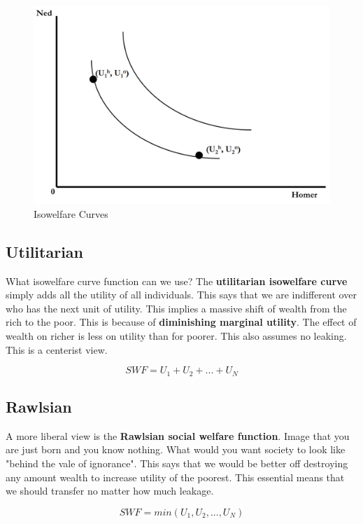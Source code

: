 \documentclass{article}
\begin{document}
\begin{figure}[H]
    \centering
    \includegraphics[scale=0.60]{"Isowelfare Curves"}
    \caption{Isowelfare Curves}
\end{figure}

\subsection{ Utilitarian }

What isowelfare curve function can we use? The \textbf{utilitarian isowelfare
curve} simply adds all the utility of all individuals. This says that we are
indifferent over who has the next unit of utility. This implies a massive shift
of wealth from the rich to the poor. This is because of \textbf{diminishing
marginal utility}. The effect of wealth on richer is less on utility than for
poorer. This also assumes no leaking. This is a centerist view.

$$ SWF = U_{1} + U_{2} + ... + U_{N} $$

\subsection{ Rawlsian }

A more liberal view is the \textbf{Rawlsian social welfare function}. Image that
you are just born and you know nothing. What would you want society to look like
"behind the vale of ignorance". This says that we would be better off destroying
any amount wealth to increase utility of the poorest. This essential means that
we should transfer no matter how much leakage.

$$ SWF = min( U_{1}, U_{2}, ..., U_{N} ) $$
\end{document}

